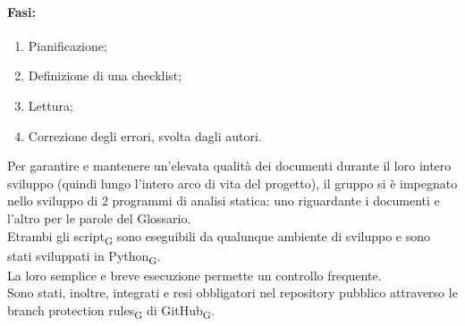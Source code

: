 \paragraph {Fasi:}\:
\begin{enumerate}
	\item Pianificazione;
	\item Definizione di una checklist;
	\item Lettura;
	\item Correzione degli errori, svolta dagli autori.
\end{enumerate}
Per garantire e mantenere un'elevata qualità dei documenti durante il loro intero sviluppo (quindi lungo
l’intero arco di vita del progetto), il gruppo si è impegnato nello sviluppo di 2 programmi di analisi statica:
uno riguardante i documenti e l'altro per le parole del Glossario.\\
Etrambi gli script\textsubscript{G} sono eseguibili da qualunque ambiente di sviluppo e sono stati sviluppati in Python\textsubscript{G}.\\
La loro semplice e breve esecuzione permette un controllo frequente.\\
Sono stati, inoltre, integrati e resi obbligatori nel repository pubblico attraverso le branch protection rules\textsubscript{G} di GitHub\textsubscript{G}.
